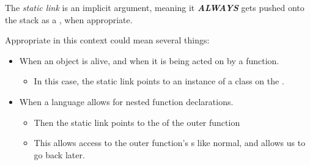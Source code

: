 \begin{definition}\label{def:Static_Link}
  The \emph{static link} is an implicit argument, meaning it \textbf{\emph{ALWAYS}} gets pushed onto the stack as a , when appropriate.

  Appropriate in this context could mean several things:
  \begin{itemize}[noitemsep]
  \item When an object is alive, and when it is being acted on by a function.
    \begin{itemize}[noitemsep]
    \item In this case, the static link points to an instance of a class on the .
    \end{itemize}
  \item When a language allows for nested function declarations.
    \begin{itemize}[noitemsep]
    \item Then the static link points to the  of the outer function
    \item This allows access to the outer function's s like normal, and allows us to go back later.
    \end{itemize}
  \end{itemize}
\end{definition}

